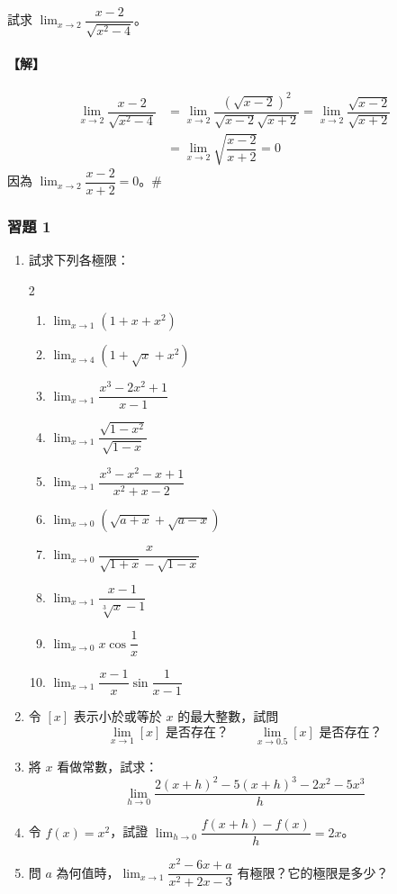 \begin{example}\label{ex:b6s-app4-6}
試求 $\lim_{x\to 2} \dfrac{x-2}{\sqrt{x^2-4}}$。
\end{example}

\paragraph{【解】}
\begin{align*}
\lim_{x\to 2} \dfrac{x-2}{\sqrt{x^2-4}} &= \lim_{x\to 2}\dfrac{(\sqrt{x-2})^2}{\sqrt{x-2}\sqrt{x+2}} = \lim_{x\to 2}\dfrac{\sqrt{x-2}}{\sqrt{x+2}} \\
&= \lim_{x\to 2}\sqrt{\dfrac{x-2}{x+2}} = 0
\end{align*}
因為 $\lim_{x\to 2}\dfrac{x-2}{x+2} = 0$。\hfill$\#$

\subsubsection*{習題 1}\label{sec:b6s-ex-app4-1}

\begin{enumerate}[label=\arabic*., leftmargin=2em]
  \item 試求下列各極限：
  \begin{multicols}{2}
  \begin{enumerate}[label=(\arabic*)]
    \item $\lim_{x\to 1}(1+x+x^2)$
    \item $\lim_{x\to 4}(1+\sqrt{x}+x^2)$
    \item $\lim_{x\to 1}\dfrac{x^3-2x^2+1}{x-1}$
    \item $\lim_{x\to 1}\dfrac{\sqrt{1-x^2}}{\sqrt{1-x}}$
    \item $\lim_{x\to 1}\dfrac{x^3-x^2-x+1}{x^2+x-2}$
    \item $\lim_{x\to 0}(\sqrt{a+x}+\sqrt{a-x})$
    \item $\lim_{x\to 0}\dfrac{x}{\sqrt{1+x}-\sqrt{1-x}}$
    \item $\lim_{x\to 1}\dfrac{x-1}{\sqrt[3]{x}-1}$
    \item $\lim_{x\to 0}x\cos\dfrac{1}{x}$
    \item $\lim_{x\to 1}\dfrac{x-1}{x}\sin\dfrac{1}{x-1}$
  \end{enumerate}
  \end{multicols}

  \item 令 $[x]$ 表示小於或等於 $x$ 的最大整數，試問
  \[ \lim_{x\to 1}[x] \text{ 是否存在？} \qquad \lim_{x\to 0.5}[x] \text{ 是否存在？} \]

  \item 將 $x$ 看做常數，試求：
  \[ \lim_{h\to 0}\dfrac{2(x+h)^2 - 5(x+h)^3 - 2x^2 - 5x^3}{h} \]

  \item 令 $f(x)=x^2$，試證 $\lim_{h\to 0}\dfrac{f(x+h)-f(x)}{h} = 2x$。

  \item 問 $a$ 為何值時，$\lim_{x\to 1}\dfrac{x^2-6x+a}{x^2+2x-3}$ 有極限？它的極限是多少？
\end{enumerate}

